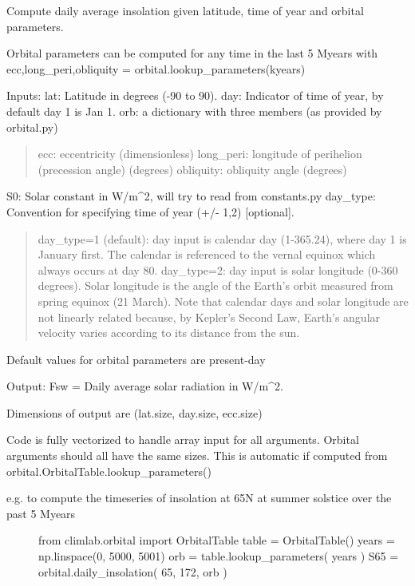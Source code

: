 \documentclass[letterpaper,10pt,english]{sphinxmanual}
\begin{document}
\begin{fulllineitems}
\label{api/climlab.solar:climlab.solar.insolation.daily_insolation}
Compute daily average insolation given latitude, time of year and orbital parameters.

Orbital parameters can be computed for any time in the last 5 Myears with
ecc,long\_peri,obliquity = orbital.lookup\_parameters(kyears)

Inputs:
lat:      Latitude in degrees (-90 to 90).
day:      Indicator of time of year, by default day 1 is Jan 1.
orb:    a dictionary with three members (as provided by orbital.py)
\begin{quote}

ecc:      eccentricity (dimensionless)
long\_peri:    longitude of perihelion (precession angle) (degrees)
obliquity:  obliquity angle (degrees)
\end{quote}

S0:       Solar constant in W/m\textasciicircum{}2, will try to read from constants.py
day\_type: Convention for specifying time of year (+/- 1,2) {[}optional{]}.
\begin{quote}

day\_type=1 (default): day input is calendar day (1-365.24), where day 1
is January first.  The calendar is referenced to the vernal equinox
which always occurs at day 80.
day\_type=2: day input is solar longitude (0-360 degrees). Solar
longitude is the angle of the Earth's orbit measured from spring
equinox (21 March). Note that calendar days and solar longitude are
not linearly related because, by Kepler's Second Law, Earth's
angular velocity varies according to its distance from the sun.
\end{quote}

Default values for orbital parameters are present-day

Output:
Fsw = Daily average solar radiation in W/m\textasciicircum{}2.

Dimensions of output are (lat.size, day.size, ecc.size)

Code is fully vectorized to handle array input for all arguments.
Orbital arguments should all have the same sizes.
This is automatic if computed from orbital.OrbitalTable.lookup\_parameters()
\begin{description}
\item[{e.g. to compute the timeseries of insolation at 65N at summer solstice over the past 5 Myears}] \leavevmode
from climlab.orbital import OrbitalTable
table = OrbitalTable()
years = np.linspace(0, 5000, 5001)
orb = table.lookup\_parameters( years )
S65 = orbital.daily\_insolation( 65, 172, orb )

\end{description}

\end{fulllineitems}
\end{document}
